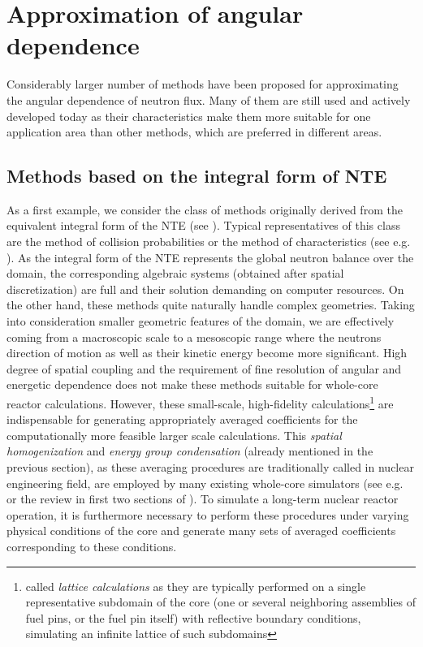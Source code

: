 \section{Approximation of angular dependence}

Considerably larger number of methods have been proposed for approximating the angular dependence of neutron
flux. Many of them are still used and actively developed today as their characteristics make them more suitable for one
application area than other methods, which are preferred in different areas.

\subsection{Methods based on the integral form of NTE} \label{sec:lattice}
As a first example, we consider the class of
methods originally derived from the equivalent integral form of the NTE (see ). Typical
representatives of this class are the method of collision probabilities or the method of characteristics (see e.g.
\cite{Cho2,Wu1,Hursin1,Petkov1,Sanchez1}). As
the integral form of the NTE represents the global neutron balance over the domain, the corresponding algebraic systems (obtained after spatial discretization) are full and
their solution demanding on computer resources. On the other hand, these methods quite naturally handle complex
geometries. Taking into consideration smaller geometric features of the domain, we are effectively coming from a
macroscopic scale to a mesoscopic range where the neutrons direction of motion as well as their kinetic energy become
more significant. High degree of spatial coupling and the requirement of fine resolution of angular and energetic
dependence does not make these methods suitable for whole-core reactor calculations.
However, these small-scale,
high-fidelity calculations\footnote{called \textit{lattice calculations} as they are typically performed on a single
representative subdomain of the core (one or several neighboring assemblies of fuel pins, or the fuel pin itself)
with reflective boundary conditions, simulating an infinite lattice of such subdomains} are indispensable for
generating appropriately averaged coefficients for the computationally more feasible larger scale calculations.
This \textit{spatial homogenization} and \textit{energy group condensation} (already mentioned in the previous
section), as these averaging procedures are traditionally called in nuclear engineering field, are employed by many existing whole-core simulators (see e.g.
\cite[Chap. 17]{Reuss1} or the review in first two sections of \cite{Sanchez7}). To simulate a long-term nuclear reactor
operation, it is furthermore necessary to perform these procedures under varying physical conditions of the core and
generate many sets of averaged coefficients corresponding to these conditions.

